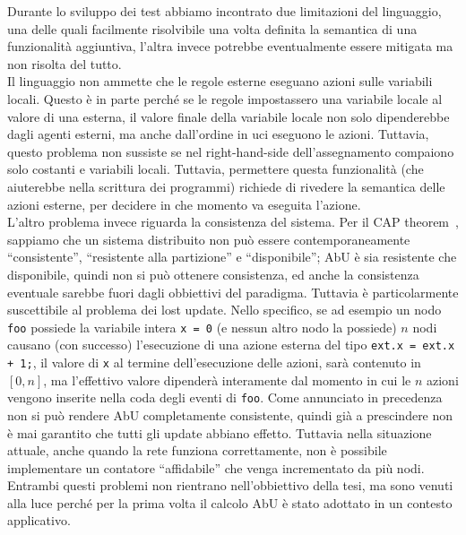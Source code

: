 \documentclass[12pt, a4paper]{article}
\begin{document}
Durante lo sviluppo dei test abbiamo incontrato due limitazioni del linguaggio, una delle quali facilmente risolvibile una volta definita la semantica di una funzionalità aggiuntiva, l'altra invece potrebbe eventualmente essere mitigata ma non risolta del tutto.\\
Il linguaggio non ammette che le regole esterne eseguano azioni sulle variabili locali. Questo è in parte perché se le regole impostassero una variabile locale al valore di una esterna, il valore finale della variabile locale non solo dipenderebbe dagli agenti esterni, ma anche dall'ordine in uci eseguono le azioni. Tuttavia, questo problema non sussiste se nel right-hand-side dell'assegnamento compaiono solo costanti e variabili locali. Tuttavia, permettere questa funzionalità (che aiuterebbe nella scrittura dei programmi) richiede di rivedere la semantica delle azioni esterne, per decidere in che momento va eseguita l'azione.\\
L'altro problema invece riguarda la consistenza del sistema. Per il CAP theorem~\cite{brewer2000towards}, sappiamo che un sistema distribuito non può essere contemporaneamente ``consistente'', ``resistente alla partizione'' e ``disponibile''; AbU è sia resistente che disponibile, quindi non si può ottenere consistenza, ed anche la consistenza eventuale sarebbe fuori dagli obbiettivi del paradigma.
Tuttavia è particolarmente suscettibile al problema dei lost update. Nello specifico, se ad esempio un nodo \lstinline{foo} possiede la variabile intera \lstinline{x = 0} (e nessun altro nodo la possiede) $n$ nodi causano (con successo) l'esecuzione di una azione esterna del tipo \lstinline{ext.x = ext.x + 1;}, il valore di \lstinline{x} al termine dell'esecuzione delle azioni, sarà contenuto in $[0,n]$, ma l'effettivo valore dipenderà interamente dal momento in cui le $n$ azioni vengono inserite nella coda degli eventi di \lstinline{foo}.
Come annunciato in precedenza non si può rendere AbU completamente consistente, quindi già a prescindere non è mai garantito che tutti gli update abbiano effetto. Tuttavia nella situazione attuale, anche quando la rete funziona correttamente, non è possibile implementare un contatore ``affidabile'' che venga incrementato da più nodi.\\
Entrambi questi problemi non rientrano nell'obbiettivo della tesi, ma sono venuti alla luce perché per la prima volta il calcolo AbU è stato adottato in un contesto applicativo.%
\end{document}
